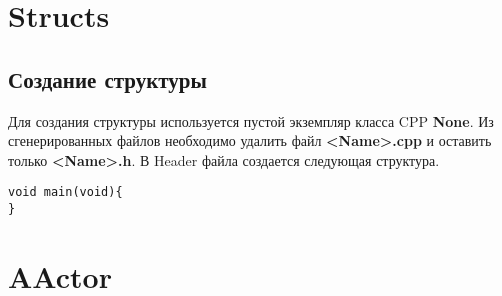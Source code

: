 \documentclass[a4paper,article,14pt]{extarticle}
\begin{document}
\tableofcontents
\pagebreak

\newpage
{}

\newpage
\section{Structs}
\subsection{Создание структуры}

Для создания структуры используется пустой экземпляр класса CPP \textbf{None}. Из сгенерированных файлов необходимо удалить файл \textbf{<Name>.cpp} и оставить только \textbf{<Name>.h}. В Header файла создается следующая структура.

\lstset{language=C}          
\begin{lstlisting}           
void main(void){
}
\end{lstlisting}          

\newpage
\section{AActor}
\end{document}
